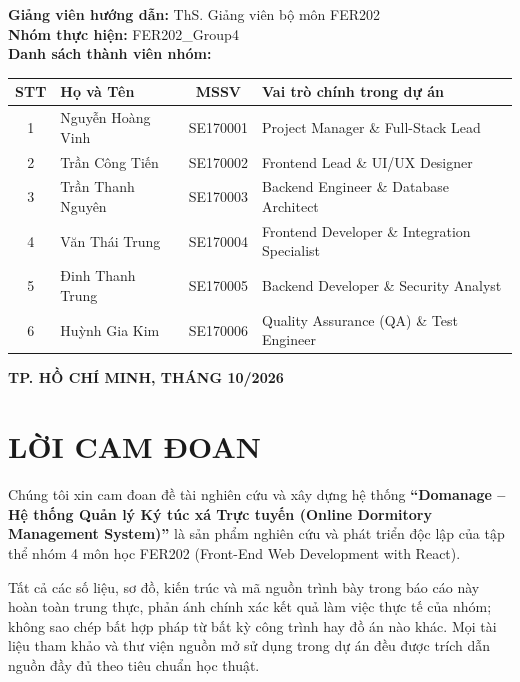 \documentclass[12pt,a4paper,oneside]{report}
\begin{document}
\begin{titlepage}
\begin{center}
\vfill
\begin{minipage}{0.9\textwidth}
\begin{flushleft}
\fontsize{12pt}{15pt}\selectfont
\textbf{Giảng viên hướng dẫn:} ThS. Giảng viên bộ môn FER202\\[0.3cm]
\textbf{Nhóm thực hiện:} FER202\_Group4\\[0.3cm]
\textbf{Danh sách thành viên nhóm:}\\[0.15cm]
\begin{tabular}{|c|l|c|l|}
\hline
\textbf{STT} & \textbf{Họ và Tên} & \textbf{MSSV} & \textbf{Vai trò chính trong dự án} \\ \hline
1 & Nguyễn Hoàng Vinh & SE170001 & Project Manager \& Full-Stack Lead \\ \hline
2 & Trần Công Tiến & SE170002 & Frontend Lead \& UI/UX Designer \\ \hline
3 & Trần Thanh Nguyên & SE170003 & Backend Engineer \& Database Architect \\ \hline
4 & Văn Thái Trung & SE170004 & Frontend Developer \& Integration Specialist \\ \hline
5 & Đinh Thanh Trung & SE170005 & Backend Developer \& Security Analyst \\ \hline
6 & Huỳnh Gia Kim & SE170006 & Quality Assurance (QA) \& Test Engineer \\ \hline
\end{tabular}
\end{flushleft}
\end{minipage}

\vfill
{\fontsize{12pt}{14pt}\selectfont \textbf{TP. HỒ CHÍ MINH, THÁNG 10/2026}}

\end{center}
\end{titlepage}

\newpage
{}
\chapter*{LỜI CAM ĐOAN}
Chúng tôi xin cam đoan đề tài nghiên cứu và xây dựng hệ thống \textbf{``Domanage -- Hệ thống Quản lý Ký túc xá Trực tuyến (Online Dormitory Management System)''} là sản phẩm nghiên cứu và phát triển độc lập của tập thể nhóm 4 môn học FER202 (Front-End Web Development with React). 

Tất cả các số liệu, sơ đồ, kiến trúc và mã nguồn trình bày trong báo cáo này hoàn toàn trung thực, phản ánh chính xác kết quả làm việc thực tế của nhóm; không sao chép bất hợp pháp từ bất kỳ công trình hay đồ án nào khác. Mọi tài liệu tham khảo và thư viện nguồn mở sử dụng trong dự án đều được trích dẫn nguồn đầy đủ theo tiêu chuẩn học thuật.
\end{document}
